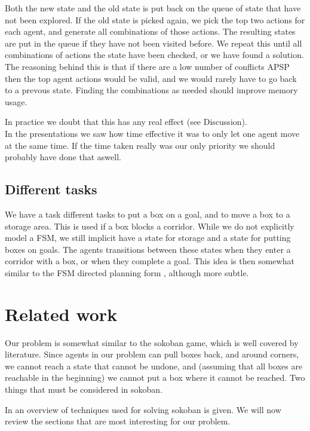 \documentclass[letterpaper]{article}
\begin{document}
Both the new state and the old state is put back on the queue of state that have
not been explored. If the old state is picked again, we pick the top two actions
for each agent, and generate all combinations of those actions. The resulting states
are put in the queue if they have not been visited before. We repeat this until
all combinations of actions the state have been checked, or we have found a solution.\\

The reasoning behind this is that if there are a low number of conflicts APSP
then the top agent actions would be valid, and we would rarely have to go back
to a prevous state. Finding the combinations as needed should improve memory usage.

In practice we doubt that this has any real effect (see Discussion).\\

In the presentations we saw how time effective it was to only let one agent move at
the same time. If the time taken really was our only priority we should probably
have done that aswell.

\subsection{Different tasks}
We have a task different tasks to put a box on a goal, and to move a box to
a storage area. This is used if a box blocks a corridor. While we do not explicitly 
model a FSM, we still implicit have a state for storage and a state for putting
boxes on goals. The agents transitions between these states when they enter
a corridor with a box, or when they complete a goal. This idea is then somewhat
similar to the FSM directed planning form \cite{JO}, although more subtle.

\section{Related work}
Our problem is somewhat similar to the sokoban game, which is well covered by
literature. Since agents in our problem can pull boxes back, and around corners,
we cannot reach a state that cannot be undone, and (assuming that all boxes are
reachable in the beginning) we cannot put a box where it cannot be reached. Two
things that must be considered in sokoban.

In \cite{sokobanMA} an overview of techniques used for solving sokoban is given.
We will now review the sections that are most interesting for our problem.\\
\end{document}
